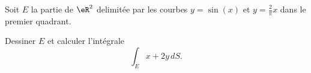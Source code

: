 \begin{exercice}\label{exoGeomAnal-0032}

Soit $E$ la partie de $\eR^2$ delimitée par les courbes $y=\sin(x)$ et $y=\frac{2}{\pi}x$ dans le premier quadrant. 

Dessiner $E$ et calculer l'intégrale 
\[
\int_{E}x+2y \, dS.
\]


\end{exercice}
